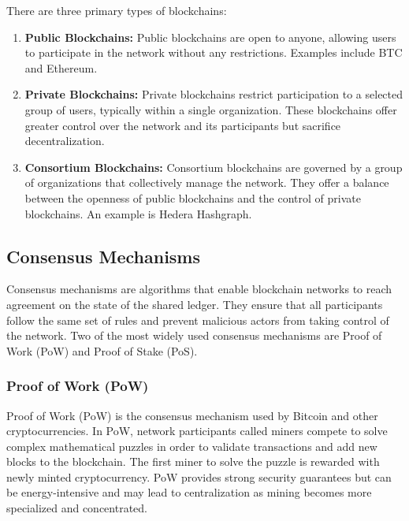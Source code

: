 There are three primary types of blockchains:

\begin{enumerate}
    \item \textbf{Public Blockchains:} Public blockchains are open to anyone, allowing users to participate in the network without any restrictions. Examples include \ac{BTC}\cite{nakamoto2008bitcoin} and \ac{Ethereum}\cite{wood2014ethereum}.
    
    \item \textbf{Private Blockchains:} Private blockchains restrict participation to a selected group of users, typically within a single organization. These blockchains offer greater control over the network and its participants but sacrifice decentralization.
    
    \item \textbf{Consortium Blockchains:} Consortium blockchains are governed by a group of organizations that collectively manage the network. They offer a balance between the openness of public blockchains and the control of private blockchains. An example is Hedera Hashgraph.
\end{enumerate}

\subsection{Consensus Mechanisms}
\label{sec:consensus_mechanisms}

Consensus mechanisms are algorithms that enable blockchain networks to reach agreement on the state of the shared ledger. They ensure that all participants follow the same set of rules and prevent malicious actors from taking control of the network. Two of the most widely used consensus mechanisms are Proof of Work (PoW) and Proof of Stake (PoS).

\subsubsection{Proof of Work (PoW)}
\label{sec:proof_of_work}

Proof of Work (PoW) is the consensus mechanism used by Bitcoin\cite{nakamoto2008bitcoin} and other cryptocurrencies. In PoW, network participants called miners compete to solve complex mathematical puzzles in order to validate transactions and add new blocks to the blockchain. The first miner to solve the puzzle is rewarded with newly minted cryptocurrency. PoW provides strong security guarantees but can be energy-intensive and may lead to centralization as mining becomes more specialized and concentrated.

